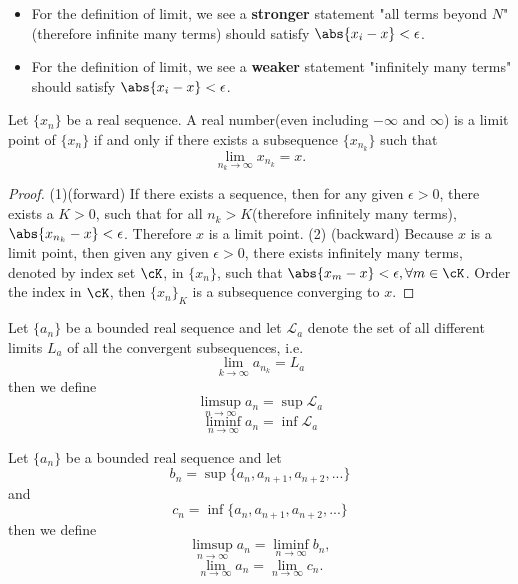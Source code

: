 \begin{refsection}
\begin{remark}
\end{remark}

\begin{remark}\hfill
	\begin{itemize}
		\item For the definition of limit, we see a \textbf{stronger} statement "all terms beyond $N$"(therefore infinite many terms) should satisfy $\abs{x_i - x} < \epsilon$.
		\item For the definition of limit, we see a \textbf{weaker} statement "infinitely many terms" should satisfy $\abs{x_i - x} < \epsilon$.
	\end{itemize}
\end{remark}

\begin{lemma}\cite[80]{strichartz2000way}
Let $\{x_n\}$ be a real sequence. A real number(even including $-\infty$ and $\infty$) is a limit point of $\{x_n\}$ if and only if there exists a subsequence $\{x_{n_k}\}$ such that $$\lim_{n_k\to \infty} x_{n_k} = x.$$
\end{lemma}
\begin{proof}
(1)(forward) If there exists a sequence, then for any given $\epsilon > 0$, there exists a $K > 0$, such that for all $n_k > K$(therefore infinitely many terms), $\abs{x_{n_k} - x} < \epsilon$. Therefore  $x$ is a limit point. 
(2)	(backward) Because $x$ is a limit point, then given any given $\epsilon > 0$, there exists infinitely many terms, denoted by index set $\cK$, in $\{x_n\}$, such that $\abs{x_m - x} < \epsilon,\forall m\in \cK$. Order the index in $\cK$, then $\{x_n\}_K$ is a subsequence converging to $x$.
\end{proof}

\begin{definition}\cite{johnsonbaugh2010foundations}
Let $\{a_n\}$ be a bounded real sequence and let $\mathcal{L}_a$ denote the set of all different limits $L_a$ of all the convergent subsequences, i.e. 
$$\lim_{k\rightarrow \infty} a_{n_k} = L_a$$
then we define
$$\limsup_{n\rightarrow \infty} a_n = \sup \mathcal{L}_a$$
$$\liminf_{n\rightarrow \infty}  a_n = \inf \mathcal{L}_a$$
\end{definition}



\begin{definition}\cite[619]{hoggintroduction}\cite[69]{johnsonbaugh2010foundations}
Let $\{a_n\}$ be a bounded real sequence and let
$$b_n = \sup \{a_n,a_{n+1},a_{n+2},...\}$$
and
$$c_n = \inf \{a_n,a_{n+1},a_{n+2},...\}$$
then we define
$$\limsup_{n\rightarrow \infty} a_n = \liminf_{n\to\infty}b_n,$$
$$\lim_{n\rightarrow \infty} a_n = \lim_{n\to\infty}c_n.$$


\end{definition}
\end{refsection}

